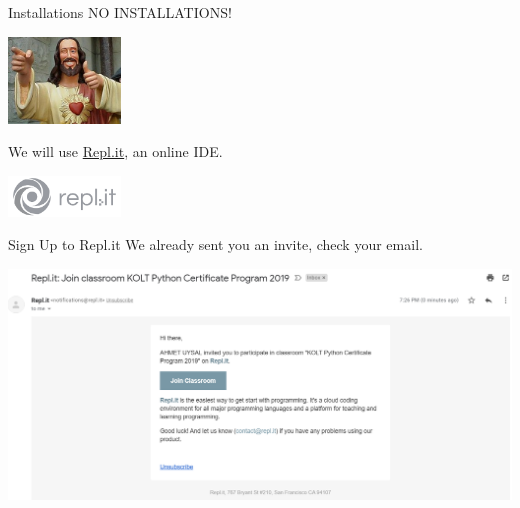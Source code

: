 	 	\begin{frame}{Installations}
			\LARGE
			\pause
			NO INSTALLATIONS!
			\begin{center}
				\includegraphics[width=3.0cm]{images/gotcha_jesus.jpg}
			\end{center}
			\pause
			We will use \href{https://repl.it}{Repl.it}, an online IDE.
			\begin{center}
				\includegraphics[width=3.0cm]{images/replit_logo.png}
			\end{center}
		\end{frame}
		
		\begin{frame}{Sign Up to Repl.it} 		
			\LARGE
			\pause
			We already sent you an invite, check your email.
			\pause
			\begin{center}
				\includegraphics[width=\textwidth]{images/replit_email.png}
			\end{center}
		\end{frame}

